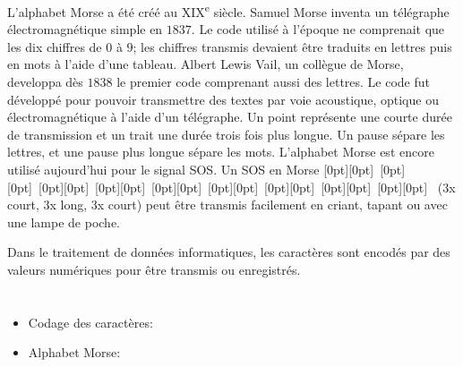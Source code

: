 {{L’alphabet Morse a été créé au XIX\textsuperscript{e} siècle. Samuel Morse inventa un télégraphe électromagnétique simple en $1837$. Le code utilisé à l’époque ne comprenait que les dix chiffres de $0$ à $9$; les chiffres transmis devaient être traduits en lettres puis en mots à l’aide d’une tableau. Albert Lewis Vail, un collègue de Morse, developpa dès $1838$ le premier code comprenant aussi des lettres. Le code fut développé pour pouvoir transmettre des textes par voie acoustique, optique ou électromagnétique à l’aide d’un télégraphe. Un point représente une courte durée de transmission et un trait une durée trois fois plus longue. Un pause sépare les lettres, et une pause plus longue sépare les mots. L’alphabet Morse est encore utilisé aujourd’hui pour le signal SOS. Un SOS en Morse \raisebox{\dimexpr -0.5ex +0.7ex \relax}[0pt][0pt]{}~\raisebox{\dimexpr -0.5ex +0.7ex \relax}[0pt][0pt]{}~\raisebox{\dimexpr -0.5ex +0.7ex \relax}[0pt][0pt]{}~\raisebox{\dimexpr -0.5ex +0.7ex \relax}[0pt][0pt]{}~\raisebox{\dimexpr -0.5ex +0.7ex \relax}[0pt][0pt]{}~\raisebox{\dimexpr -0.5ex +0.7ex \relax}[0pt][0pt]{}~\raisebox{\dimexpr -0.5ex +0.7ex \relax}[0pt][0pt]{}~\raisebox{\dimexpr -0.5ex +0.7ex \relax}[0pt][0pt]{}~\raisebox{\dimexpr -0.5ex +0.7ex \relax}[0pt][0pt]{}~ (3x court, 3x long, 3x court) peut être transmis facilement en criant, tapant ou avec une lampe de poche.

Dans le traitement de données informatiques, les caractères sont encodés par des valeurs numériques pour être transmis ou enregistrés.



\section*{\BrochureWebsitesAndKeywords}
{\raggedright
\begin{itemize}
  \item Codage des caractères: \href{https://fr.wikipedia.org/wiki/Codage_des_caract\%C3\%A8res}{}
  \item Alphabet Morse: \href{https://fr.wikipedia.org/wiki/Code_Morse_international}{}
\end{itemize}


}}}
